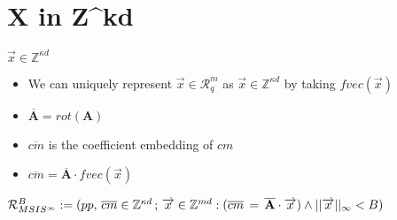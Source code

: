 \section{X in Z^{kd}}
\begin{frame}{$\overrightarrow{x} \in \mathbb{Z}^{\kappa d}$}

    \begin{itemize}
        \item We can uniquely represent $\overrightarrow{x} \in \mathcal{R}^m_q$ as $\overrightarrow{x} \in \mathbb{Z}^{\kappa d}$ by taking $fvec(\overrightarrow{x})$
        \item $\overline{\mathbf{A}} = rot(\mathbf{A})$
        \item $\overline{cm}$ is the coefficient embedding of $cm$
        \item $\overline{cm} = \overline{\mathbf{A}} \cdot fvec(\overrightarrow{x})$
    \end{itemize}
    $\mathcal{R}^B_{MSIS^{\infty}} := {(pp, \, \overline{cm} \in \mathbb{Z}^{\kappa d}\, ;\, \overrightarrow{x}  \in \mathbb{Z}^{m d} : (\overline{cm}\, =\,\overline{ \bf{A}}\cdot \overrightarrow{x} ) \land ||\overrightarrow{x}||_{\infty} < B  )}$
\end{frame}